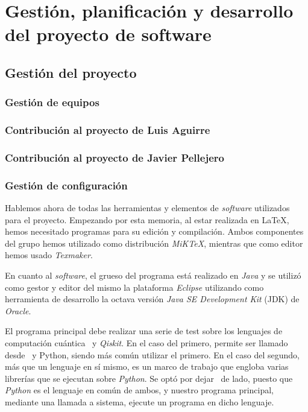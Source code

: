 \chapter{Gestión, planificación y desarrollo del proyecto de software}

\section{Gestión del proyecto}

\subsection{Gestión de equipos}

\subsection{Contribución al proyecto de Luis Aguirre}

\subsection{Contribución al proyecto de Javier Pellejero}

\subsection{Gestión de configuración}

Hablemos ahora de todas las herramientas y elementos de \textit{software} utilizados para el proyecto. Empezando por esta memoria, al estar realizada en \LaTeX, hemos necesitado programas para su edición y compilación. Ambos componentes del grupo hemos utilizado como distribución \textit{MiKTeX}, mientras que como editor hemos usado \textit{Texmaker}.

En cuanto al \textit{software}, el grueso del programa está realizado en \textit{Java} y se utilizó como gestor y editor del mismo la plataforma \textit{Eclipse} utilizando como herramienta de desarrollo la octava versión \textit{Java SE Development Kit} (JDK) de \textit{Oracle}.

El programa principal debe realizar una serie de test sobre los lenguajes de computación cuántica \qsh\ y \textit{Qiskit}. En el caso del primero, permite ser llamado desde \csh\ y {Python}, siendo más común utilizar el primero. En el caso del segundo, más que un lenguaje en sí mismo, es un marco de trabajo que engloba varias librerías que se ejecutan sobre \textit{Python}. Se optó por dejar \csh\ de lado, puesto que \textit{Python} es el lenguaje en común de ambos, y nuestro programa principal, mediante una llamada a sistema, ejecute un programa en dicho lenguaje.

